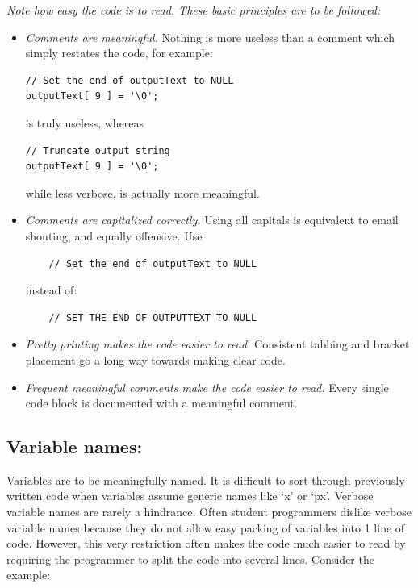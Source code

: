 \documentclass{report}
\begin{document}
{\em Note how easy the code is to read.  These basic principles are to
be followed:}
\begin{itemize}
\item {\em Comments are meaningful.}  Nothing is more useless than a
      comment which simply restates the code, for example:

\begin{verbatim}
// Set the end of outputText to NULL
outputText[ 9 ] = '\0';
\end{verbatim}

is truly useless, whereas

\begin{verbatim}
// Truncate output string
outputText[ 9 ] = '\0';
\end{verbatim}

while less verbose, is actually more meaningful.

\item {\em Comments are capitalized correctly.}  Using all capitals is
      equivalent to email shouting, and equally offensive.  Use

\begin{verbatim}
	// Set the end of outputText to NULL
\end{verbatim}

instead of:

\begin{verbatim}
	// SET THE END OF OUTPUTTEXT TO NULL
\end{verbatim}

\item {\em Pretty printing makes the code easier to read.}  Consistent
      tabbing and bracket placement go a long way towards making clear
      code.

\item {\em Frequent meaningful comments make the code easier to read.}
      Every single code block is documented with a meaningful comment.

\end{itemize}

\subsection{Variable names:}\label{varnames}

Variables are to be meaningfully named.  It is difficult to sort
through previously written code when variables assume generic names
like `x' or `px'.  Verbose variable names are rarely a hindrance.
Often student programmers dislike verbose variable names because they
do not allow easy packing of variables into 1 line of code.  However,
this very restriction often makes the code much easier to read by
requiring the programmer to split the code into several lines.
Consider the example:
\end{document}
